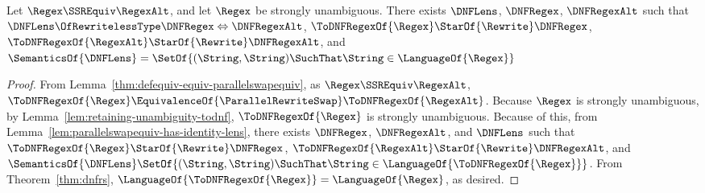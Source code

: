 \documentclass[acmsmall,screen]{acmart}
\begin{document}
\begin{mylemma}
  \label{lem:identity-definitional-equivalence}
  Let $\Regex \SSREquiv \RegexAlt$, and let $\Regex$ be strongly
  unambiguous.  There exists $\DNFLens$, $\DNFRegex$, $\DNFRegexAlt$ such that
  $\DNFLens \OfRewritelessType \DNFRegex \Leftrightarrow \DNFRegexAlt$,
  $\ToDNFRegexOf{\Regex} \StarOf{\Rewrite} \DNFRegex$,
  $\ToDNFRegexOf{\RegexAlt} \StarOf{\Rewrite} \DNFRegexAlt$, and
  $\SemanticsOf{\DNFLens} =
  \SetOf{(\String,\String) \SuchThat \String\in\LanguageOf{\Regex}}$
\end{mylemma}
\begin{proof}
  From Lemma~\ref{thm:defequiv-equiv-parallelswapequiv}, as 
  $\Regex \SSREquiv \RegexAlt$,
  $\ToDNFRegexOf{\Regex} \EquivalenceOf{\ParallelRewriteSwap}
  \ToDNFRegexOf{\RegexAlt}$.
  Because $\Regex$ is strongly unambiguous, by
  Lemma~\ref{lem:retaining-unambiguity-todnf}, $\ToDNFRegexOf{\Regex}$ is strongly
  unambiguous.
  Because of this, from Lemma~\ref{lem:parallelswapequiv-has-identity-lens},
  there exists $\DNFRegex$, $\DNFRegexAlt$, and $\DNFLens$ such that
  $\ToDNFRegexOf{\Regex} \StarOf{\Rewrite} \DNFRegex$,
  $\ToDNFRegexOf{\RegexAlt} \StarOf{\Rewrite} \DNFRegexAlt$, and
  $\SemanticsOf{\DNFLens} 
  \SetOf{(\String,\String) \SuchThat
    \String\in\LanguageOf{\ToDNFRegexOf{\Regex}}}$.
  From Theorem~\ref{thm:dnfrs}, $\LanguageOf{\ToDNFRegexOf{\Regex}} =
  \LanguageOf{\Regex}$, as desired.
\end{proof}
\end{document}
